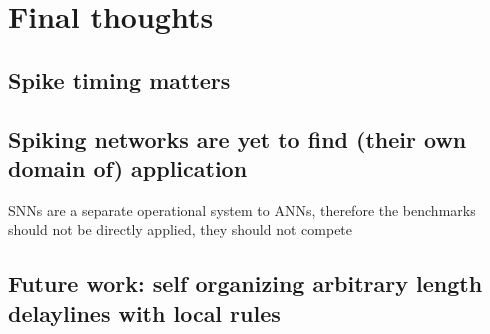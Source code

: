 \chapter{Final thoughts}
\label{ch:conclusion}

\section{Spike timing matters}

\section{Spiking networks are yet to find (their own domain of) application}

SNNs are a separate operational system to ANNs, therefore the benchmarks should not be directly applied, they should not compete

\section{Future work: self organizing arbitrary length delaylines with local rules}